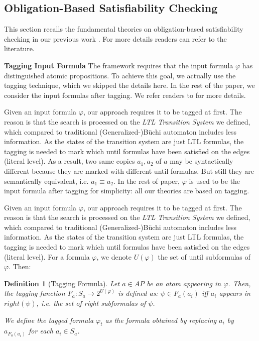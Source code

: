 \documentclass[conference]{IEEEtran}
\newtheorem{definition}{Definition}
\def\phi{\varphi}
\begin{document}
\subsection{Obligation-Based Satisfiability Checking}

This section recalls the fundamental theories on obligation-based satisfiability 
checking in our previous work \cite{LZPVH13}. For more details readers can refer to the literature.

\iffalse
\noindent
\textbf{Tagging Input Formula}
The framework requires that the input formula $\phi$ has distinguished atomic propositions. 
To achieve this goal, we actually use the tagging technique, which we skipped the  
details here. In the rest of the paper, we consider the input formulas after tagging. We refer 
readers to \cite{LZPVH13} for more details. 


Given an input formula $\phi$, our approach requires it to be tagged at first. 
The reason is that the search is processed on the \textit{LTL Transition System} we defined, 
which compared to traditional (Generalized-)B\"uchi automaton includes less information. 
As the states of the transition system are just LTL formulas, the tagging is needed to mark 
which until formulas have been satisfied on the edges (literal level). As a result, two same 
copies $a_1,a_2$ of $a$ may be syntactically different because they are marked with different until 
formulas. But still they are semantically equivalent, i.e. $a_1\equiv a_2$. 
In the rest of paper, $\phi$ is used to be the input formula after tagging for simplicity: all our theories are based on tagging. 


Given an input formula $\phi$, our approach requires it to be tagged at first. 
The reason is that the search is processed on the \textit{LTL Transition System} we defined, 
which compared to traditional (Generalized-)B\"uchi automaton includes less information. 
As the states of the transition system are just LTL formulas, the tagging is needed to mark 
which until formulas have been satisfied on the edges (literal level). For a formula $\phi$,
we denote $U(\phi)$ the set of until
subformulas of $\phi$. Then:
\begin{definition}[Tagging Formula]\label{def:tagging}
  Let $a\in AP$ be an atom appearing in $\phi$.  Then, the tagging
  function $F_a:S_a\rightarrow 2^{U(\phi)}$ is defined as:
  $\psi\in F_a(a_i)$ iff $a_i$ appears in $right(\psi)$, i.e. the set of right subformulas of $\psi$.

  We define the \emph{tagged formula} $\phi_t$ as the formula obtained
  by replacing $a_i$ by $a_{F_a(a_i)}$ for each $a_i\in S_a$. 
\end{definition}
\end{document}
